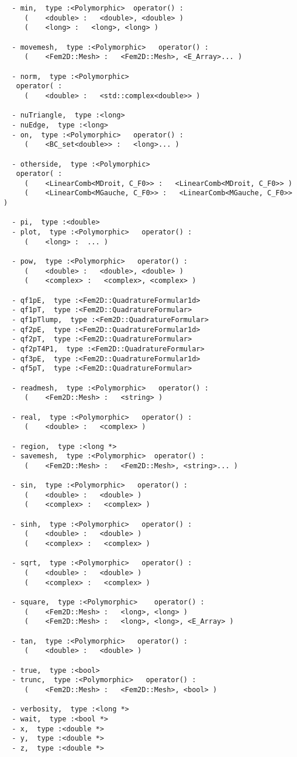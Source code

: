 \documentclass[twoside]{book}
\begin{document}
\begin{verbatim}
  - min,  type :<Polymorphic>  operator() : 
	 (	  <double> :   <double>, <double> )
	 (	  <long> :   <long>, <long> )

  - movemesh,  type :<Polymorphic>   operator() : 
	 (	  <Fem2D::Mesh> :   <Fem2D::Mesh>, <E_Array>... )

  - norm,  type :<Polymorphic>
   operator( : 
	 (	  <double> :   <std::complex<double>> )

  - nuTriangle,  type :<long>
  - nuEdge,  type :<long>
  - on,  type :<Polymorphic>   operator() : 
	 (	  <BC_set<double>> :   <long>... )

  - otherside,  type :<Polymorphic>
   operator( : 
	 (	  <LinearComb<MDroit, C_F0>> :   <LinearComb<MDroit, C_F0>> )
	 (	  <LinearComb<MGauche, C_F0>> :   <LinearComb<MGauche, C_F0>> )

  - pi,  type :<double>
  - plot,  type :<Polymorphic>   operator() : 
	 (	  <long> :  ... )

  - pow,  type :<Polymorphic>   operator() : 
	 (	  <double> :   <double>, <double> )
	 (	  <complex> :   <complex>, <complex> )

  - qf1pE,  type :<Fem2D::QuadratureFormular1d>
  - qf1pT,  type :<Fem2D::QuadratureFormular>
  - qf1pTlump,  type :<Fem2D::QuadratureFormular>
  - qf2pE,  type :<Fem2D::QuadratureFormular1d>
  - qf2pT,  type :<Fem2D::QuadratureFormular>
  - qf2pT4P1,  type :<Fem2D::QuadratureFormular>
  - qf3pE,  type :<Fem2D::QuadratureFormular1d>
  - qf5pT,  type :<Fem2D::QuadratureFormular>

  - readmesh,  type :<Polymorphic>   operator() : 
	 (	  <Fem2D::Mesh> :   <string> )

  - real,  type :<Polymorphic>   operator() : 
	 (	  <double> :   <complex> )

  - region,  type :<long *>
  - savemesh,  type :<Polymorphic>  operator() : 
	 (	  <Fem2D::Mesh> :   <Fem2D::Mesh>, <string>... )

  - sin,  type :<Polymorphic>   operator() : 
	 (	  <double> :   <double> )
	 (	  <complex> :   <complex> )

  - sinh,  type :<Polymorphic>   operator() : 
	 (	  <double> :   <double> )
	 (	  <complex> :   <complex> )

  - sqrt,  type :<Polymorphic>   operator() : 
	 (	  <double> :   <double> )
	 (	  <complex> :   <complex> )

  - square,  type :<Polymorphic>    operator() : 
	 (	  <Fem2D::Mesh> :   <long>, <long> )
	 (	  <Fem2D::Mesh> :   <long>, <long>, <E_Array> )

  - tan,  type :<Polymorphic>   operator() : 
	 (	  <double> :   <double> )

  - true,  type :<bool>
  - trunc,  type :<Polymorphic>   operator() : 
	 (	  <Fem2D::Mesh> :   <Fem2D::Mesh>, <bool> )

  - verbosity,  type :<long *>
  - wait,  type :<bool *>
  - x,  type :<double *>
  - y,  type :<double *>
  - z,  type :<double *>    
\end{verbatim}
\end{document}

